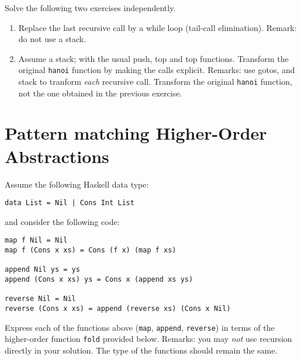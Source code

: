 \documentclass{article}
\newcommand{\answer}[1]{}
\begin{document}
Solve the following two exercises independently.
\begin{enumerate}
\item Replace the last recursive call by a while loop (tail-call
  elimination). Remark: do not use a stack. 
  \answer{
    \begin{verbatim}
    void move_many(int n, int source, int intermediate, int target) {
      while (n > 0) {
        move_many(n-1,source,target,intermediate);
        move_disk(source,target);
        n = n-1;
        swap(source,intermediate);
      }
    }
    \end{verbatim}}
\item Assume a stack; with the usual push, top and top
  functions. Transform the original \texttt{hanoi} function by making
  the calls explicit. Remarks: use gotos, and stack to tranform \emph{each}
  recursive call. Transform the original \texttt{hanoi} function, not
  the one obtained in the previous exercise. 
  \answer{
    \begin{verbatim}
      void move_many(int n, int s, int i, int d) {
        push(n,s,i,d,0);
      call:
        if (stk->n!=0) {
          push(stk->n-1,stk->s,stk->i,stk->d,1);
          goto call;
      loc1:
          move_disk(stk->s,stk->d);
          push(stk->n-1,stk->i,stk->s,stk->d,2);;
          goto call;
      loc2:
        }
        caller = stk->caller;
        pop();
        if (caller == 1) goto loc1;
        if (caller == 2) goto loc2;
      }
    \end{verbatim}
  }
\end{enumerate}
\section{Pattern matching Higher-Order Abstractions}

Assume the following Haskell data type:
\begin{verbatim}
data List = Nil | Cons Int List
\end{verbatim}
and consider the following code:
\begin{verbatim}
map f Nil = Nil
map f (Cons x xs) = Cons (f x) (map f xs)

append Nil ys = ys
append (Cons x xs) ys = Cons x (append xs ys)

reverse Nil = Nil
reverse (Cons x xs) = append (reverse xs) (Cons x Nil)
\end{verbatim}

Express each of the functions above (\texttt{map}, \texttt{append},
\texttt{reverse})  in terms of the higher-order
function \texttt{fold} provided below.  Remarks: you may \emph{not}
use recursion directly in your solution. The type of the functions
should remain the same.
\end{document}
